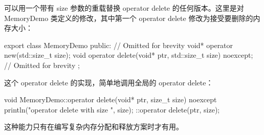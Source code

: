 可以用一个带有 size 参数的重载替换 operator delete 的任何版本。这里是对 MemoryDemo 类定义的修改，其中第一个 operator delete 修改为接受要删除的内存大小：

\begin{cpp}
export class MemoryDemo
{
    public:
        // Omitted for brevity
        void* operator new(std::size_t size);
        void operator delete(void* ptr, std::size_t size) noexcept;
        // Omitted for brevity
};
\end{cpp}

这个 operator delete 的实现，简单地调用全局的 operator delete：

\begin{cpp}
void MemoryDemo::operator delete(void* ptr, size_t size) noexcept
{
    println("operator delete with size {}", size);
    ::operator delete(ptr, size);
}
\end{cpp}

这种能力只有在编写复杂内存分配和释放方案时才有用。




